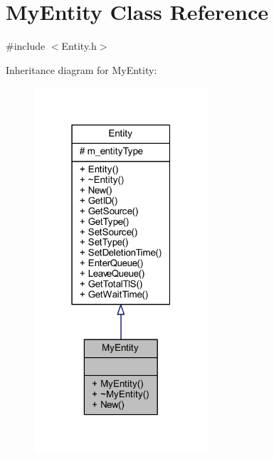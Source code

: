 \hypertarget{class_my_entity}{}\section{My\+Entity Class Reference}
\label{class_my_entity}


{\ttfamily \#include $<$Entity.\+h$>$}



Inheritance diagram for My\+Entity\+:
\nopagebreak
\begin{figure}[H]
\begin{center}
\leavevmode
\includegraphics[width=183pt]{class_my_entity__inherit__graph}
\end{center}
\end{figure}


